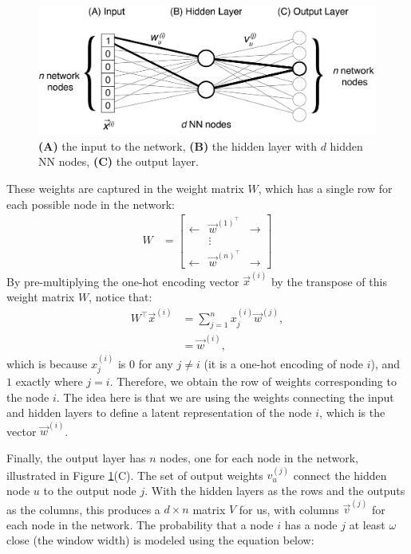 \begin{figure}
    \centering
    \includegraphics[width=\linewidth]{next/Images/skipgram.png}
    \caption[Skip-gram model]{\textbf{(A)} the input to the network, \textbf{(B)} the hidden layer with $d$ hidden NN nodes, \textbf{(C)} the output layer.}
    \label{fig:next:diff:skipgram}
\end{figure}

These weights are captured in the weight matrix $W$, which has a single row for each possible node in the network:
\begin{align*}
    W &= \begin{bmatrix}
        \leftarrow & \vec w^{(1)}^\top & \rightarrow \\
        & \vdots & \\
        \leftarrow & \vec w^{(n)}^\top & \rightarrow
    \end{bmatrix}
\end{align*}
By pre-multiplying the one-hot encoding vector $\vec x^{(i)}$ by the transpose of this weight matrix $W$, notice that:
\begin{align*}
    W^\top \vec x^{(i)} &= \sum_{j = 1}^n x^{(i)}_j\vec w^{(j)}, \\
    &= \vec w^{(i)},
\end{align*}
which is because $x^{(i)}_j$ is $0$ for any $j \neq i$ (it is a one-hot encoding of node $i$), and $1$ exactly where $j = i$. Therefore, we obtain the row of weights corresponding to the node $i$. The idea here is that we are using the weights connecting the input and hidden layers to define a latent representation of the node $i$, which is the vector $\vec w^{(i)}$.

Finally, the output layer has $n$ nodes, one for each node in the network, illustrated in Figure \ref{fig:next:diff:skipgram}(C). The set of output weights $v_{u}^{(j)}$ connect the hidden node $u$ to the output node $j$. With the hidden layers as the rows and the outputs as the columns, this produces a $d \times n$ matrix $V$ for us, with columns $\vec v^{(j)}$ for each node in the network. The probability that a node $i$ has a node $j$ at least $\omega$ close (the window width) is modeled using the equation below:

